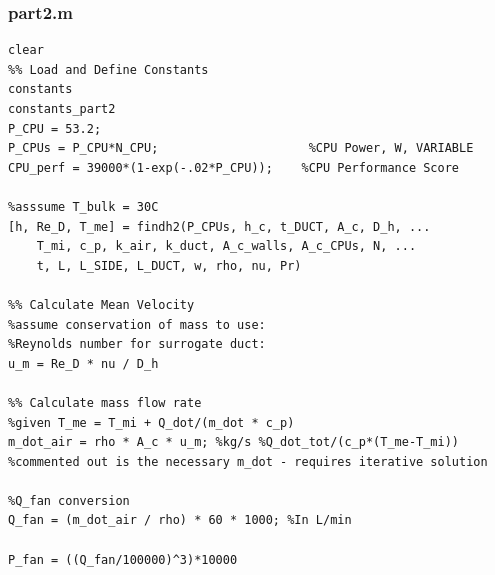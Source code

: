 \documentclass[12pt, titlepage]{article}
\begin{document}
\subsubsection{part2.m}
\begin{verbatim}
clear
%% Load and Define Constants
constants
constants_part2
P_CPU = 53.2;
P_CPUs = P_CPU*N_CPU;                     %CPU Power, W, VARIABLE
CPU_perf = 39000*(1-exp(-.02*P_CPU));    %CPU Performance Score

%asssume T_bulk = 30C
[h, Re_D, T_me] = findh2(P_CPUs, h_c, t_DUCT, A_c, D_h, ...
    T_mi, c_p, k_air, k_duct, A_c_walls, A_c_CPUs, N, ...
    t, L, L_SIDE, L_DUCT, w, rho, nu, Pr)

%% Calculate Mean Velocity
%assume conservation of mass to use:
%Reynolds number for surrogate duct:
u_m = Re_D * nu / D_h

%% Calculate mass flow rate
%given T_me = T_mi + Q_dot/(m_dot * c_p)
m_dot_air = rho * A_c * u_m; %kg/s %Q_dot_tot/(c_p*(T_me-T_mi))
%commented out is the necessary m_dot - requires iterative solution

%Q_fan conversion
Q_fan = (m_dot_air / rho) * 60 * 1000; %In L/min

P_fan = ((Q_fan/100000)^3)*10000
\end{verbatim}	
\noindent
\end{document}
